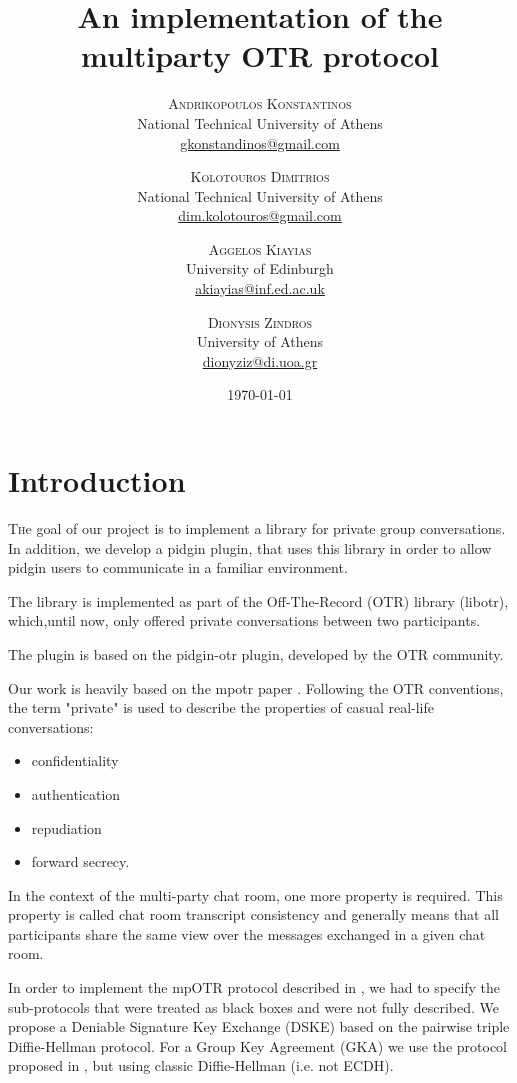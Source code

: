 \documentclass[]{article}
\title{An implementation of the multiparty OTR protocol} %
\author{%
\textsc{Andrikopoulos Konstantinos}\\[1ex] %
\normalsize National Technical University of Athens \\ %
\normalsize \href{mailto:gkonstandinos@gmail.com}{gkonstandinos@gmail.com} %
\and %
\textsc{Kolotouros Dimitrios} \\[1ex] %
\normalsize National Technical University of Athens \\ %
\normalsize \href{dim.kolotouros@gmail.com}{dim.kolotouros@gmail.com}  %
\and %
\textsc{Aggelos Kiayias} \\[1ex] %
\normalsize University of Edinburgh \\ %
\normalsize \href{mailto:akiayias@inf.ed.ac.uk}{akiayias@inf.ed.ac.uk} \\[1ex]%
\and%
\textsc{Dionysis Zindros} \\[1ex] %
\normalsize University of Athens \\ %
\normalsize \href{mailto:dionyziz@di.uoa.gr}{dionyziz@di.uoa.gr} %
}
\date{\today} %
\begin{document}
\maketitle


\section{Introduction}

\lettrine[nindent=0em,lines=3]{T}he goal of our project is to implement a library for private group conversations.
In addition, we develop a pidgin plugin, that uses this library in order to allow pidgin users to communicate in a familiar environment.

The library is implemented as part of the Off-The-Record (OTR) library (libotr), which,until now, only offered private conversations between two participants.

The plugin is based on the pidgin-otr plugin, developed by the OTR community.

Our work is heavily based on the mpotr paper \cite{mpotr}.
Following the OTR conventions, the term "private" is used to describe the properties of casual real-life conversations:

\begin{itemize}
  \item confidentiality
  \item authentication
  \item repudiation
  \item forward secrecy.
\end{itemize}

In the context of the multi-party chat room, one more property is required.
This property is called chat room transcript consistency and generally means that all participants share the same view over the messages  exchanged in a given chat room.

In order to implement the mpOTR protocol described in \cite{mpotr}, we had to specify the sub-protocols that were treated as black boxes and were not fully described.
We propose a Deniable Signature Key Exchange (DSKE) based on the pairwise triple Diffie-Hellman protocol.
For a Group Key Agreement (GKA) we use the protocol proposed in \cite{mpenc}, but using classic Diffie-Hellman (i.e. not ECDH).
\end{document}
